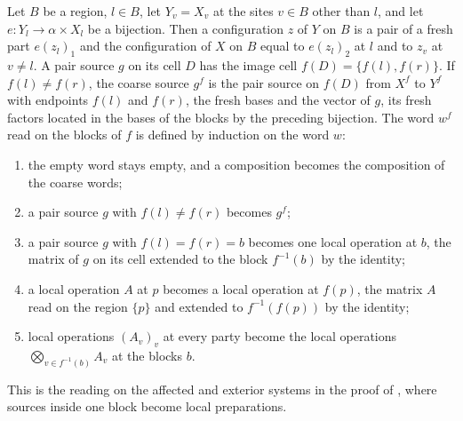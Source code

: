 \begin{definition}
    \label{def:party_coarsen}
    \leanok
    Let $B$ be a region, $l\in B$, let $Y_v=X_v$ at the sites $v\in B$ other than $l$,
    and let $e\colon Y_l\to\alpha\times X_l$ be a bijection. Then a configuration $z$
    of $Y$ on $B$ is a pair of a fresh part $e(z_l)_1$ and the configuration of $X$ on
    $B$ equal to $e(z_l)_2$ at $l$ and to $z_v$ at $v\neq l$. A pair source $g$ on its
    cell $D$ has the image cell $f(D)=\{f(l),f(r)\}$. If $f(l)\neq f(r)$, the coarse
    source $g^f$ is the pair source on $f(D)$ from $X^f$ to $Y^f$ with endpoints
    $f(l)$ and $f(r)$, the fresh bases and the vector of $g$, its fresh factors located
    in the bases of the blocks by the preceding bijection. The word $w^f$ read on the
    blocks of $f$ is defined by induction on the word $w$:
    \begin{enumerate}
        \item the empty word stays empty, and a composition becomes the
              composition of the coarse words;
        \item a pair source $g$ with $f(l)\neq f(r)$ becomes $g^f$;
        \item a pair source $g$ with $f(l)=f(r)=b$ becomes one local operation at
              $b$, the matrix of $g$ on its cell extended to the block $f^{-1}(b)$ by
              the identity;
        \item a local operation $A$ at $p$ becomes a local operation at $f(p)$, the
              matrix $A$ read on the region $\{p\}$ and extended to $f^{-1}(f(p))$
              by the identity;
        \item local operations $(A_v)_v$ at every party become the local operations
              $\bigotimes_{v\in f^{-1}(b)}A_v$ at the blocks $b$.
    \end{enumerate}
    This is the reading on the affected and exterior systems in the proof of
    \cite[Theorem~5.2]{OpenAI2026PolynomialPEPS}, where sources inside one block
    become local preparations.
\end{definition}

